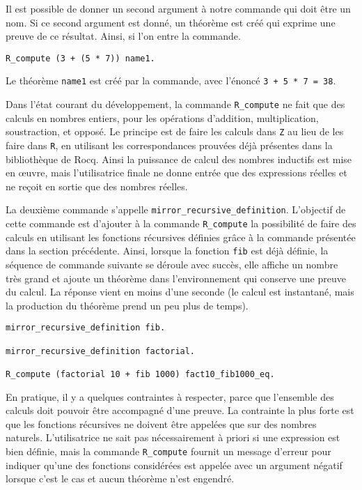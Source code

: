 \documentclass[draft]{jflart}
\begin{document}
Il est possible de donner un second argument à notre commande qui doit
être un nom.  Si ce second argument est donné, un théorème est créé
qui exprime une preuve de ce résultat.  Ainsi, si l'on entre la
commande.
\begin{verbatim}
R_compute (3 + (5 * 7)) name1.
\end{verbatim}
Le théorème \texttt{name1} est créé par la commande, avec l'énoncé \texttt{3
  + 5 * 7 = 38}.

Dans l'état courant du développement, la commande \texttt{R\_compute}
ne fait que des calculs en nombres entiers, pour les opérations
d'addition, multiplication, soustraction, et opposé.  Le principe est
de faire les calculs dans \texttt{Z} au lieu de les faire dans \texttt{R},
en utilisant les correspondances prouvées déjà présentes dans la
bibliothèque de Rocq.  Ainsi la puissance de calcul des nombres
inductifs est mise en œuvre, mais l'utilisatrice finale ne donne
entrée que des expressions réelles et ne reçoit en sortie que des
nombres réelles.

La deuxième commande s'appelle \texttt{mirror\_recursive\_definition}.
L'objectif de cette commande est d'ajouter à la commande
\texttt{R\_compute} la possibilité de faire des calculs en utilisant
les fonctions récursives définies grâce à la commande présentée dans
la section précédente.  Ainsi, lorsque la fonction \texttt{fib} est
déjà définie, la séquence de commande suivante se déroule avec succès,
elle affiche un nombre très grand et ajoute un théorème dans
l'environnement qui conserve une preuve du calcul.  La réponse vient
en moins d'une seconde (le calcul est instantané, mais la production
du théorème prend un peu plus de temps).
\begin{verbatim}
mirror_recursive_definition fib.

mirror_recursive_definition factorial.

R_compute (factorial 10 + fib 1000) fact10_fib1000_eq.
\end{verbatim}
En pratique, il y a quelques contraintes à respecter, parce que
l'ensemble des calculs doit pouvoir être accompagné d'une preuve.  La
contrainte la plus forte est que les fonctions récursives ne doivent
être appelées que sur des nombres naturels.  L'utilisatrice ne sait
pas nécessairement à priori si une expression est bien définie, mais
la commande \texttt{R\_compute} fournit un message d'erreur pour indiquer
qu'une des fonctions considérées est appelée avec un argument négatif
lorsque c'est le cas et aucun théorème n'est engendré.
\end{document}
